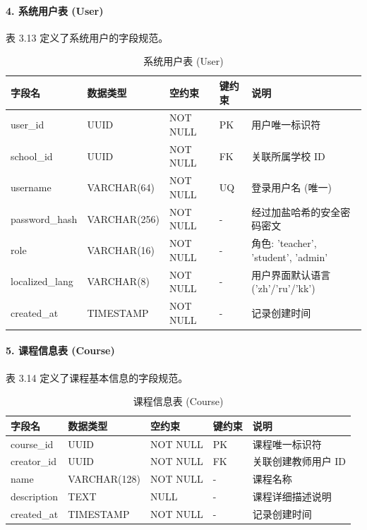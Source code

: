 \paragraph{4. 系统用户表 (User)}
表 3.13 定义了系统用户的字段规范。
\begin{table}[H]
\centering
\caption{系统用户表 (User)}
\begin{tabularx}{\textwidth}{l p{3.2cm} p{1.8cm} p{1.8cm} X}
\toprule
\textbf{字段名} & \textbf{数据类型} & \textbf{空约束} & \textbf{键约束} & \textbf{说明} \\
\midrule
user\_id & UUID & NOT NULL & PK & 用户唯一标识符 \\
school\_id & UUID & NOT NULL & FK & 关联所属学校 ID \\
username & VARCHAR(64) & NOT NULL & UQ & 登录用户名 (唯一) \\
password\_hash & VARCHAR(256) & NOT NULL & - & 经过加盐哈希的安全密码密文 \\
role & VARCHAR(16) & NOT NULL & - & 角色: 'teacher', 'student', 'admin' \\
localized\_lang & VARCHAR(8) & NOT NULL & - & 用户界面默认语言 ('zh'/'ru'/'kk') \\
created\_at & TIMESTAMP & NOT NULL & - & 记录创建时间 \\
\bottomrule
\end{tabularx}
\end{table}

\paragraph{5. 课程信息表 (Course)}
表 3.14 定义了课程基本信息的字段规范。
\begin{table}[H]
\centering
\caption{课程信息表 (Course)}
\begin{tabularx}{\textwidth}{l p{3.2cm} p{1.8cm} p{1.8cm} X}
\toprule
\textbf{字段名} & \textbf{数据类型} & \textbf{空约束} & \textbf{键约束} & \textbf{说明} \\
\midrule
course\_id & UUID & NOT NULL & PK & 课程唯一标识符 \\
creator\_id & UUID & NOT NULL & FK & 关联创建教师用户 ID \\
name & VARCHAR(128) & NOT NULL & - & 课程名称 \\
description & TEXT & NULL & - & 课程详细描述说明 \\
created\_at & TIMESTAMP & NOT NULL & - & 记录创建时间 \\
\bottomrule
\end{tabularx}
\end{table}

